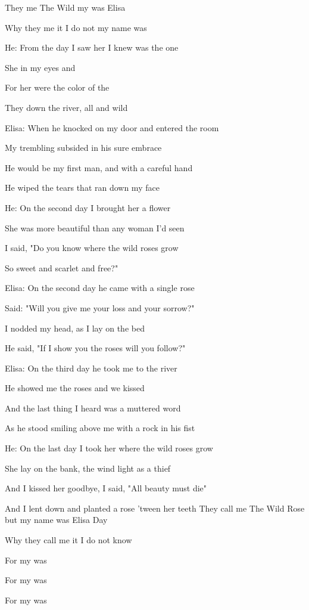 
\zr
They  me The Wild   my  was Elisa 

Why they  me it I do not   my name was  
\kr

He:
\zs
From the  day I saw her I knew  was the one 

She  in my eyes and 

For her  were the color of the  

They  down the river, all  and wild
\ks

Elisa:
\zs
When he knocked on my door and entered the room

My trembling subsided in his sure embrace

He would be my first man, and with a careful hand

He wiped the tears that ran down my face
\ks

\zr \kr

He:
\zs
On the second day I brought her a flower

She was more beautiful than any woman I'd seen

I said, "Do you know where the wild roses grow

So sweet and scarlet and free?"
\ks


Elisa:
\zs
On the second day he came with a single rose

Said: "Will you give me your loss and your sorrow?"

I nodded my head, as I lay on the bed

He said, "If I show you the roses will you follow?"
\ks

\zr \kr

Elisa:
\zs
On the third day he took me to the river

He showed me the roses and we kissed

And the last thing I heard was a muttered word

As he stood smiling above me with a rock in his fist 
\ks

He:
\zs
On the last day I took her where the wild roses grow

She lay on the bank, the wind light as a thief

And I kissed her goodbye, I said, "All beauty must die"

And I lent down and planted a rose 'tween her teeth 
\ks
\zr
They call me The Wild Rose but my name was Elisa Day

Why they call me it I do not know

For my  was  

For my  was  

For my  was  
\kr

\kp
